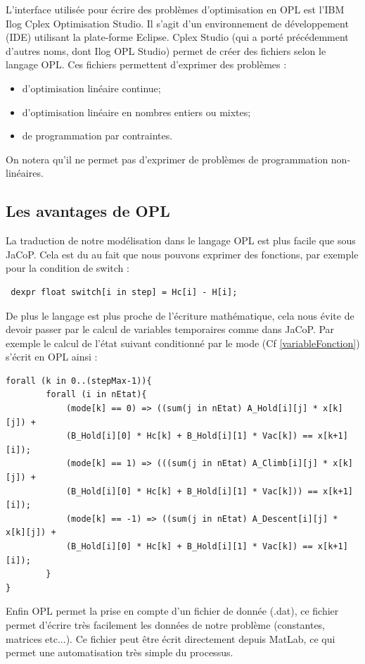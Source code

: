  L'interface utilisée pour écrire des problèmes d'optimisation en OPL est l'IBM Ilog Cplex Optimisation Studio. Il s'agit d'un environnement de développement (IDE) utilisant la plate-forme Eclipse. Cplex Studio (qui a porté précédemment d'autres noms, dont Ilog OPL Studio) permet de créer des fichiers selon le langage OPL. Ces fichiers permettent d'exprimer des problèmes :
 \begin{itemize}
	\item d'optimisation linéaire continue;
	\item d'optimisation linéaire en nombres entiers ou mixtes;
	\item de programmation par contraintes.
 \end{itemize}
 On notera qu'il ne permet pas d'exprimer de problèmes de programmation non-linéaires.

 \subsection{Les avantages de OPL}
 La traduction de notre modélisation dans le langage OPL est plus facile que sous JaCoP. Cela est du au fait que nous pouvons exprimer des fonctions, par exemple pour la condition de switch  :
 \begin{verbatim}
 dexpr float switch[i in step] = Hc[i] - H[i];
 \end{verbatim}

De plus le langage est plus proche de l'écriture mathématique, cela nous évite de devoir passer par le calcul de variables temporaires comme dans JaCoP. Par exemple le calcul de l'état suivant conditionné par le mode (Cf \ref{variableFonction}) s'écrit en OPL ainsi : 
\begin{verbatim}
forall (k in 0..(stepMax-1)){
	    forall (i in nEtat){     	  
		    (mode[k] == 0) => ((sum(j in nEtat) A_Hold[i][j] * x[k][j]) +
            (B_Hold[i][0] * Hc[k] + B_Hold[i][1] * Vac[k]) == x[k+1][i]);
		    (mode[k] == 1) => (((sum(j in nEtat) A_Climb[i][j] * x[k][j]) +
            (B_Hold[i][0] * Hc[k] + B_Hold[i][1] * Vac[k])) == x[k+1][i]);
		    (mode[k] == -1) => ((sum(j in nEtat) A_Descent[i][j] * x[k][j]) +
            (B_Hold[i][0] * Hc[k] + B_Hold[i][1] * Vac[k]) == x[k+1][i]);
	    }	  			
}
\end{verbatim}

Enfin OPL permet la prise en compte d'un fichier de donnée (.dat), ce fichier permet d'écrire très facilement les données de notre problème (constantes, matrices etc...). Ce fichier peut être écrit directement depuis MatLab, ce qui permet une automatisation très simple du processus.

